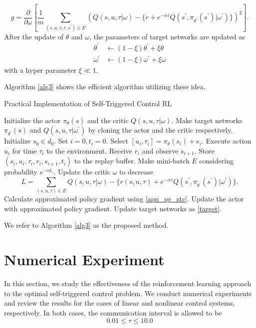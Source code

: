 \documentclass[english, dvipdfmx]{ampmt}             %
\newcommand{\pdif}[2]{\frac{\partial#1}{\partial#2}}
\begin{document}
\begin{equation}
	g = \pdif{}{\omega}\left[\frac{1}{m}\sum_{(s,u,\tau,r,s^{\prime})\in E}\left(Q(s,u,\tau|\omega) - \{r + e^{-\alpha\tau}Q(s^{\prime}, \pi_{\theta^{\prime}}(s^{\prime})|\omega^{\prime})\}\right)^2\right].
\end{equation}
After the update of $\theta$ and $\omega$, the parameters of target networks are updated as
\begin{equation}
  \begin{split}
  	\theta^{\prime} &\gets (1-\xi)\theta^{\prime} + \xi\theta \\
	\omega^{\prime} &\gets (1-\xi)\omega^{\prime} + \xi\omega \label{target}
  \end{split}
\end{equation}
with a hyper parameter $\xi\ll1$.\par
Algorithm \ref{alg3} shows the efficient algorithm utilizing these idea.
\begin{algorithm}                      
\caption{Practical Implementation of Self-Triggered Control RL}         
\label{alg3}                          
\begin{algorithmic}                  
    \STATE Initialize the actor $\pi_{\theta}(s)$ and the critic $Q(s,u,\tau|\omega)$.
    \STATE Make target networks $\pi_{\theta^{\prime}}(s)$ and $Q(s,u,\tau|\omega^{\prime})$ by cloning the actor and the critic respectively.
    	\STATE Initialize $s_0\in d_0$.
    	\STATE Set $i = 0, t_i = 0$.
    		\STATE Select $[u_i, \tau_i] = \pi_{\theta}(s_i) + e_i$.
		\STATE Execute action $u_i$ for time $\tau_i$ to the environment.
		\STATE Receive $r_i$ and observe $s_{i+1}$.
		\STATE Store $(s_i, u_i, \tau_i, r_i, s_{i+1}, t_i)$ to the replay buffer.
		\STATE Make mini-batch $E$ considering probability $e^{-\alpha t_i}$.
		\STATE Update the critic $\omega$ to decrease 
			\[L = \sum_{(s,u,\tau)\in E}Q(s,u,\tau|\omega) - \{r(s,u,\tau) + e^{-\alpha\tau}Q(s^{\prime}, \pi_{\theta^{\prime}}(s^{\prime})|\omega^{\prime})\}.\]
		\STATE Calculate approximated policy gradient using \eqref{app_pg_stc}.
		\STATE Update the actor with approximated policy gradient.
		\STATE Update target networks as \eqref{target}.
    	\ENDWHILE
    \ENDFOR
\end{algorithmic}
\end{algorithm}
We refer to Algorithm \ref{alg3} as the proposed method.

\section{Numerical Experiment}
In this section, we study the effectiveness of the reinforcement learning approach to the optimal self-triggered control problem. We conduct numerical experiments and review the results for the cases of linear and nonlinear control systems, respectively. In both cases, the communication interval is allowed to be 
\begin{equation}
	0.01 \leq \tau \leq 10.0
\end{equation}
\end{document}
